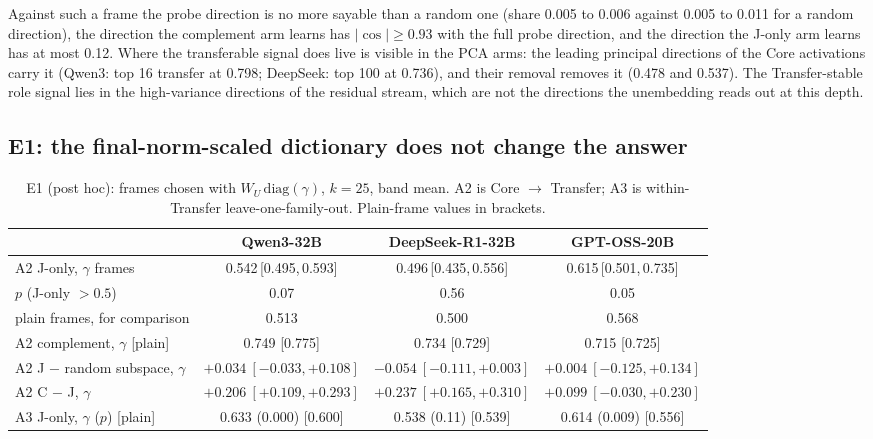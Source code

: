 \documentclass[11pt,a4paper]{article}
\newcommand{\ci}[3]{#1\,[#2,\,#3]}
\newcommand{\WU}{W_U}
\begin{document}
Against such a frame the probe direction is no more sayable than a random one (share 0.005 to 0.006 against 0.005 to 0.011 for a random direction), the direction the complement arm learns has $|\cos|\ge0.93$ with the full probe direction, and the direction the J-only arm learns has at most 0.12. Where the transferable signal does live is visible in the PCA arms: the leading principal directions of the Core activations carry it (Qwen3: top 16 transfer at 0.798; DeepSeek: top 100 at 0.736), and their removal removes it (0.478 and 0.537). The Transfer-stable role signal lies in the high-variance directions of the residual stream, which are not the directions the unembedding reads out at this depth.

\subsection{E1: the final-norm-scaled dictionary does not change the answer}
\label{sec:e1}

\begin{table}[t]
\centering
\caption{E1 (post hoc): frames chosen with $\WU\,\mathrm{diag}(\gamma)$, $k=25$, band mean. A2 is Core $\to$ Transfer; A3 is within-Transfer leave-one-family-out. Plain-frame values in brackets.}
\label{tab:e1}
\footnotesize
\begin{tabular}{@{}lccc@{}}
\toprule
 & \textbf{Qwen3-32B} & \textbf{DeepSeek-R1-32B} & \textbf{GPT-OSS-20B} \\
\midrule
A2 J-only, $\gamma$ frames & \ci{0.542}{0.495}{0.593} & \ci{0.496}{0.435}{0.556} & \ci{0.615}{0.501}{0.735} \\
\quad $p$ (J-only $>0.5$) & 0.07 & 0.56 & 0.05 \\
\quad plain frames, for comparison & 0.513 & 0.500 & 0.568 \\
A2 complement, $\gamma$ [plain] & 0.749 [0.775] & 0.734 [0.729] & 0.715 [0.725] \\
A2 J $-$ random subspace, $\gamma$ & $+0.034~[-0.033,+0.108]$ & $-0.054~[-0.111,+0.003]$ & $+0.004~[-0.125,+0.134]$ \\
A2 C $-$ J, $\gamma$ & $+0.206~[+0.109,+0.293]$ & $+0.237~[+0.165,+0.310]$ & $+0.099~[-0.030,+0.230]$ \\
A3 J-only, $\gamma$ ($p$) [plain] & 0.633 (0.000) [0.600] & 0.538 (0.11) [0.539] & 0.614 (0.009) [0.556] \\
\bottomrule
\end{tabular}
\end{table}
\end{document}
